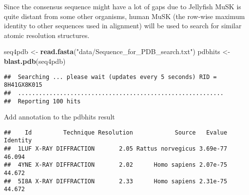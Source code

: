 \documentclass[]{article}
\newenvironment{Shaded}{\begin{snugshade}}{\end{snugshade}}
\newcommand{\KeywordTok}[1]{\textcolor[rgb]{0.13,0.29,0.53}{\textbf{#1}}}
\newcommand{\DataTypeTok}[1]{\textcolor[rgb]{0.13,0.29,0.53}{#1}}
\newcommand{\DecValTok}[1]{\textcolor[rgb]{0.00,0.00,0.81}{#1}}
\newcommand{\StringTok}[1]{\textcolor[rgb]{0.31,0.60,0.02}{#1}}
\newcommand{\OtherTok}[1]{\textcolor[rgb]{0.56,0.35,0.01}{#1}}
\newcommand{\OperatorTok}[1]{\textcolor[rgb]{0.81,0.36,0.00}{\textbf{#1}}}
\newcommand{\NormalTok}[1]{#1}
\begin{document}
Since the consensus sequence might have a lot of gaps due to Jellyfish
MuSK is quite distant from some other organisms, human MuSK (the
row-wise maximum identity to other sequences used in alignment) will be
used to search for similar atomic resolution structures.

\begin{Shaded}
\begin{Highlighting}[]
\NormalTok{seq4pdb <-}\StringTok{ }\KeywordTok{read.fasta}\NormalTok{(}\StringTok{"data/Sequence_for_PDB_search.txt"}\NormalTok{)}
\NormalTok{pdbhits <-}\StringTok{ }\KeywordTok{blast.pdb}\NormalTok{(seq4pdb)}
\end{Highlighting}
\end{Shaded}

\begin{verbatim}
##  Searching ... please wait (updates every 5 seconds) RID = 8H41GX8K015 
##  ...........................................................
##  Reporting 100 hits
\end{verbatim}

Add annotation to the pdbhits result

\begin{Shaded}
\end{Shaded}

\begin{verbatim}
##    Id         Technique Resolution            Source   Evalue Identity
##  1LUF X-RAY DIFFRACTION       2.05 Rattus norvegicus 3.69e-77   46.094
##  4YNE X-RAY DIFFRACTION       2.02      Homo sapiens 2.07e-75   44.672
##  5I8A X-RAY DIFFRACTION       2.33      Homo sapiens 2.31e-75   44.672
\end{verbatim}
\end{document}
